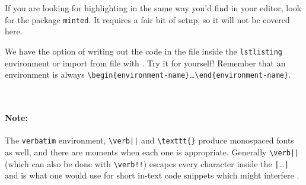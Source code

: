 If you are looking for highlighting in the same way you'd find in your editor, look for the package \texttt{minted}.
It requires a fair bit of setup, so it will not be covered here.

We have the option of writing out the code in the file inside the \verb|lstlisting| environment or import from file with \verb||. Try it for yourself! Remember that an environment is always \verb|\begin{environment-name}|\dots\verb|\end{environment-name}|.
\begin{lstlisting}
    
\end{lstlisting}

\paragraph{Note:}
The \texttt{verbatim} environment, \verb!\verb||! and \verb|\texttt{}| produce monospaced fonts as well, and there are moments when each one is appropriate.
Generally \verb!\verb||! (which can also be done with \verb|\verb!!|) escapes every character inside the \verb!|!\dots\verb!|! and is what one would use for short in-text code snippets which might interfere .
